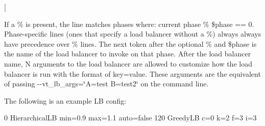 \begin{DoxyCode}
[%
\end{DoxyCode}


If a {\ttfamily \%} is present, the line matches phases where\+: {\ttfamily current phase \% \$phase == 0}. Phase-\/specific lines (ones that specify a load balancer without a {\ttfamily \%}) always always have precedence over {\ttfamily \%} lines. The next token after the optional {\ttfamily \%} and {\ttfamily \$phase} is the name of the load balancer to invoke on that phase. After the load balancer name, {\ttfamily N} arguments to the load balancer are allowed to customize how the load balancer is run with the format of {\ttfamily key=value}. These arguments are the equivalent of passing {\ttfamily -\/-\/vt\+\_\+lb\+\_\+args=\char`\"{}\+A=test B=test2\char`\"{}} on the command line.

The following is an example LB config\+:


\begin{DoxyCode}
0 HierarchicalLB min=0.9 max=1.1 auto=false
120 GreedyLB c=0 k=2 f=3 i=3
\end{DoxyCode}


